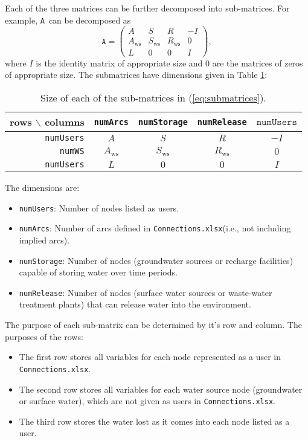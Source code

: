 \documentclass[11pt]{article}
\newcommand{\connections}{\texttt{Connections.xlsx}}
\newcommand{\A}{\texttt{A}}
\newcommand{\numUsers}{\texttt{numUsers}}
\newcommand{\numArcs}{\texttt{numArcs}}
\newcommand{\numStorage}{\texttt{numStorage}}
\newcommand{\numRelease}{\texttt{numRelease}}
\newcommand{\numWS}{\texttt{numWS}}
\begin{document}
Each of the three matrices can be further decomposed into sub-matrices.
For example, \A\ can be decomposed as
\begin{equation}
	\A = 
	\left(
	\begin{array}{cccc}
		A &   S & R   & -I \\
		A_\text{ws} & S_\text{ws} & R_\text{ws} &  0 \\
		L &   0 & 0   &  I
	\end{array}
	\right),
	\label{eq:submatrices}
\end{equation}
where $I$ is the identity matrix of appropriate size and $0$ are the matrices of zeros of appropriate size.
The submatrices have dimensions given in Table \ref{tb:submatrices}:
\begin{table}[!h]
	\centering
	\begin{tabular}{|r|c|c|c|c|}
		\hline
		rows $\backslash$ columns& \numArcs & \numStorage & \numRelease & $\numUsers$ \\
		\hline
		\numUsers & $A$           & $S$           & $R$           & $-I$ \\
		\numWS       & $A_\text{ws}$ & $S_\text{ws}$ & $R_\text{ws}$ & $0$  \\
		\numUsers & $L$           & $0$           & $0$           & $I$  \\
		\hline
	\end{tabular}
	\caption{
		Size of each of the sub-matrices in (\ref{eq:submatrices}).
	}
	\label{tb:submatrices}
\end{table}

The dimensions are:
\begin{itemize}
	\item \numUsers: Number of nodes listed as users.
	\item \numArcs: Number of arcs defined in \connections (i.e., not including implied arcs).
	\item \numStorage: Number of nodes (groundwater sources or recharge facilities) capable of storing water over time periods.
	\item \numRelease: Number of nodes (surface water sources or waste-water treatment plants) that can release water into the environment.
\end{itemize}

The purpose of each sub-matrix can be determined by it's row and column.
The purposes of the rows:
\begin{itemize}
	\item The first row stores all variables for each node represented as a user in \connections.
	\item The second row stores all variables for each water source node (groundwater or surface water), which are not given as users in \connections.
	\item The third row stores the water lost as it comes into each node listed as a user.
\end{itemize}
\end{document}
